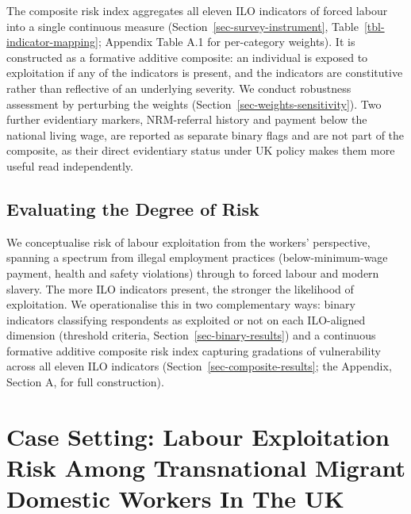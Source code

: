 \documentclass[
  12pt,
  letterpaper,
  DIV=11,
  numbers=noendperiod]{scrartcl}
\begin{document}
The composite risk index aggregates all eleven ILO indicators of forced
labour into a single continuous measure
(Section~\ref{sec-survey-instrument}, Table~\ref{tbl-indicator-mapping};
Appendix Table A.1 for per-category weights). It is constructed as a
formative additive composite: an individual is exposed to exploitation
if any of the indicators is present, and the indicators are constitutive
rather than reflective of an underlying severity. We conduct robustness
assessment by perturbing the weights
(Section~\ref{sec-weights-sensitivity}). Two further evidentiary
markers, NRM-referral history and payment below the national living
wage, are reported as separate binary flags and are not part of the
composite, as their direct evidentiary status under UK policy makes them
more useful read independently.

\subsection{Evaluating the Degree of Risk}\label{sec-degree-of-risk}

We conceptualise risk of labour exploitation from the workers'
perspective, spanning a spectrum from illegal employment practices
(below-minimum-wage payment, health and safety violations) through to
forced labour and modern slavery. The more ILO indicators present, the
stronger the likelihood of exploitation. We operationalise this in two
complementary ways: binary indicators classifying respondents as
exploited or not on each ILO-aligned dimension (threshold criteria,
Section~\ref{sec-binary-results}) and a continuous formative additive
composite risk index capturing gradations of vulnerability across all
eleven ILO indicators (Section~\ref{sec-composite-results}; the
Appendix, Section A, for full construction).

\section{Case Setting: Labour Exploitation Risk Among Transnational
Migrant Domestic Workers In The UK}\label{sec-case-setting}
\end{document}
